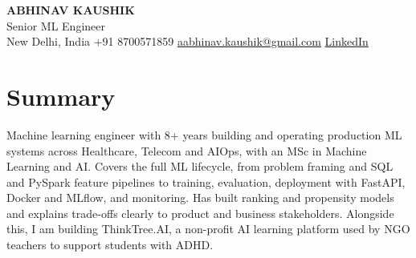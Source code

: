 \documentclass[10pt,a4paper]{article}
\begin{document}
\begin{center}
  {\LARGE\bfseries ABHINAV KAUSHIK}\\[2pt]
  {\large Senior ML Engineer}\\[2pt]
  New Delhi, India \textbar{} +91 8700571859 \textbar{} \href{mailto:aabhinav.kaushik@gmail.com}{aabhinav.kaushik@gmail.com} \textbar{} \href{https://www.linkedin.com/in/abhinav-kaushik10/}{LinkedIn}  
\end{center}

\section{Summary}
Machine learning engineer with 8+ years building and operating production ML systems across Healthcare, Telecom and AIOps, with an MSc in Machine Learning and AI. Covers the full ML lifecycle, from problem framing and SQL and PySpark feature pipelines to training, evaluation, deployment with FastAPI, Docker and MLflow, and monitoring. Has built ranking and propensity models and explains trade-offs clearly to product and business stakeholders. Alongside this, I am building ThinkTree.AI, a non-profit AI learning platform used by NGO teachers to support students with ADHD.
\end{document}
